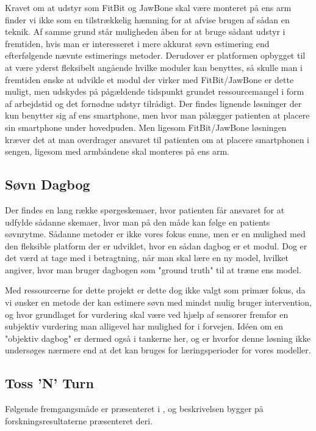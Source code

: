 Kravet om at udstyr som FitBit og JawBone skal være monteret på ens arm finder vi ikke som en tilstrækkelig hæmning for at afvise brugen af sådan en teknik.
Af samme grund står muligheden åben for at bruge sådant udstyr i fremtiden, hvis man er interesseret i mere akkurat søvn estimering end efterfølgende nævnte estimerings metoder.
Derudover er platformen opbygget til at være yderst fleksibelt angående hvilke moduler kan benyttes, så skulle man i fremtiden ønske at udvikle et modul der virker med FitBit/JawBone er dette muligt, men udskydes på pågældende tidspunkt grundet ressourcemangel i form af arbejdstid og det fornødne udstyr tilrådigt.
Der findes lignende løsninger der kun benytter sig af ens smartphone, men hvor man pålægger patienten at placere sin smartphone under hovedpuden.
Men ligesom FitBit/JawBone løsningen kræver det at man overdrager ansvaret til patienten om at placere smartphonen i sengen, ligesom med armbåndene skal monteres på ens arm.

\subsection{Søvn Dagbog}
Der findes en lang række spørgeskemaer, hvor patienten får ansvaret for at udfylde sådanne skemaer, hvor man på den måde kan følge en patients søvnrytme.
Sådanne metoder er ikke vores fokus emne, men er en mulighed med den fleksible platform der er udviklet, hvor en sådan dagbog er et modul.
Dog er det værd at tage med i betragtning, når man skal lære en ny model, hvilket \cite{Min:2014:TNT:2556288.2557220} angiver, hvor man bruger dagbogen som "ground truth" til at træne ens model.

Med ressourcerne for dette projekt er dette dog ikke valgt som primær fokus, da vi ønsker en metode der kan estimere søvn med mindst mulig bruger intervention, og hvor grundlaget for vurdering skal være ved hjælp af sensorer fremfor en subjektiv vurdering man alligevel har mulighed for i forvejen.
Idéen om en "objektiv dagbog" er dermed også i tankerne her, og er hvorfor denne løsning ikke undersøges nærmere end at det kan bruges for læringsperioder for vores modeller.

\subsection{Toss 'N' Turn}
Følgende fremgangsmåde er præsenteret i \citet{Min:2014:TNT:2556288.2557220}, og beskrivelsen bygger på forskningsresultaterne præsenteret deri.

